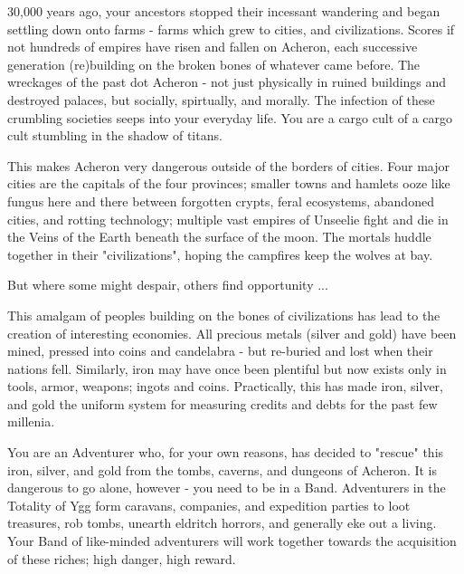 {  


  30,000 years ago, your ancestors stopped their incessant wandering and began settling down onto farms - farms which grew to cities, and civilizations.  Scores if not hundreds of empires have risen and fallen on Acheron, each successive generation (re)building on the broken bones of whatever came before.  The wreckages of the past dot Acheron - not just physically in ruined buildings and destroyed palaces, but socially, spirtually, and morally.  The infection of these crumbling societies seeps into your everyday life.  You are a cargo cult of a cargo cult stumbling in the shadow of titans.

  This makes Acheron very dangerous outside of the borders of cities.  Four major cities are the capitals of the four provinces; smaller towns and hamlets ooze like fungus here and there between forgotten crypts, feral ecosystems, abandoned cities, and rotting technology; multiple vast empires of Unseelie fight and die in the Veins of the Earth beneath the surface of the moon.  The mortals huddle together in their "civilizations", hoping the campfires keep the wolves at bay.

  But where some might despair, others find opportunity ...  



  This amalgam of peoples building on the bones of civilizations has lead to the creation of interesting economies.  All precious metals (silver and gold) have been mined, pressed into coins and candelabra - but re-buried and lost when their nations fell.  Similarly, iron may have once been plentiful but now exists only in tools, armor, weapons; ingots and coins.  Practically, this has made iron, silver, and gold the uniform system for measuring credits and debts for the past few millenia.

  You are an Adventurer who, for your own reasons, has decided to "rescue" this iron, silver, and gold from the tombs, caverns, and dungeons of Acheron.  It is dangerous to go alone, however - you need to be in a Band.  Adventurers in the Totality of Ygg form caravans, companies, and expedition parties to loot treasures, rob tombs, unearth eldritch horrors, and generally eke out a living.  Your Band of like-minded adventurers will work together towards the acquisition of these riches; high danger, high reward.  


}
